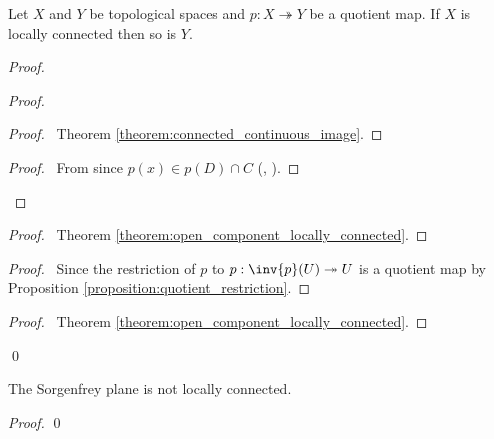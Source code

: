 \begin{proposition}
    Let $X$ and $Y$ be topological spaces and $p : X \twoheadrightarrow Y$ be a quotient map. If $X$ is locally connected then so is $Y$.
\end{proposition}

\begin{proof}
    \pf
    \begin{proof}
        \begin{proof}
            \pf\ Theorem \ref{theorem:connected_continuous_image}.
        \end{proof}
        \begin{proof}
            \pf\ From  since $p(x) \in p(D) \cap C$ (, ).
        \end{proof}
    \end{proof}
    \begin{proof}
        \pf\ Theorem \ref{theorem:open_component_locally_connected}.
    \end{proof}
    \begin{proof}
        \pf\ Since the restriction of $p$ to $p : \inv{p}(U) \twoheadrightarrow U$
        is a quotient map by Proposition \ref{proposition:quotient_restriction}.
    \end{proof}
    \qedstep
    \begin{proof}
        \pf\ Theorem \ref{theorem:open_component_locally_connected}.
    \end{proof}
    \qed
\end{proof}

\begin{proposition}
    The Sorgenfrey plane is not locally connected.
\end{proposition}

\begin{proof}
    \pf
    \step{2}{\pick\ $x$, $y$ such that $[0,x) \times [0,y) \subseteq U$}
    \step{3}{$[0,x/2)\times[0,y/2)$ is clopen in $U$.}
    \qed
\end{proof}

